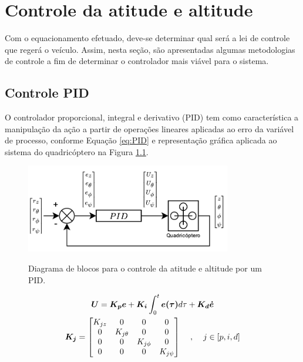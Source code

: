 \documentclass[main.tex]{subfiles}
\begin{document}
\chapter{Controle da atitude e altitude}\label{chap:controle}

Com o equacionamento efetuado, deve-se determinar qual será a lei de controle que regerá o veículo. Assim, nesta seção, são apresentadas algumas metodologias de controle a fim de determinar o controlador mais viável para o sistema.

\section{Controle PID}

O controlador proporcional, integral e derivativo (PID) tem como característica a manipulação da ação a partir de operações lineares aplicadas ao erro da variável de processo, conforme Equação \ref{eq:PID} e representação gráfica aplicada ao sistema do quadricóptero na Figura \ref{fig:PID}.

\begin{figure}[!h]
    \centering
    \caption{Diagrama de blocos para o controle da atitude e altitude por um PID.}
    \includegraphics[width=0.8\textwidth]{capitulos/controle_atitude/imgs/controle_PID.png}
    \label{fig:PID}
\end{figure}

\begin{equation}\label{eq:PID}
    \begin{gathered}
        \boldsymbol{U} = \boldsymbol{K_p}\boldsymbol{e} + \boldsymbol{K_i}\int_0^t\boldsymbol{e(\tau)}d\tau + \boldsymbol{K_d}\boldsymbol{\dot{e}}\\
        \boldsymbol{K_j} =\begin{bmatrix}
            K_{jz} & 0 & 0 & 0\\
            0 & K_{j\theta} & 0 & 0\\
            0 & 0 & K_{j\phi} & 0\\
            0 & 0 & 0 & K_{j\psi}
        \end{bmatrix} \hspace{0.4cm} , \hspace{0.4cm} j \in [p, i, d]
    \end{gathered}
\end{equation}
\end{document}
